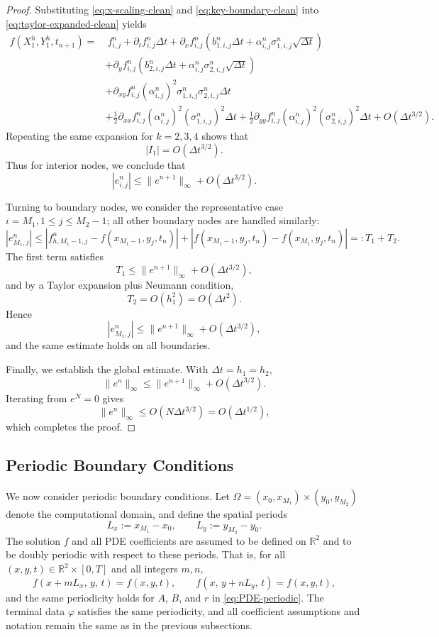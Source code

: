 \documentclass[11pt]{article}
\theoremstyle{mythm}
\theoremstyle{definition}
\begin{document}
\begin{proof}
		Substituting \eqref{eq:x-scaling-clean} and \eqref{eq:key-boundary-clean} into \eqref{eq:taylor-expanded-clean} yields
		\[
		\begin{aligned}
			f(X_1^h,Y_1^h,t_{n+1})
			=&\ f_{i,j}^n 
			+ \partial_t f_{i,j}^n\Delta t
			+ \partial_x f_{i,j}^n(b_{1,i,j}^n\Delta t + \alpha_{i,j}^n\sigma_{1,i,j}^n\sqrt{\Delta t}) \\
			&+ \partial_y f_{i,j}^n(b_{2,i,j}^n\Delta t + \alpha_{i,j}^n\sigma_{2,i,j}^n\sqrt{\Delta t}) \\
			&+ \partial_{xy}f_{i,j}^n(\alpha_{i,j}^n)^2\sigma_{1,i,j}^n\sigma_{2,i,j}^n\Delta t \\
			&+ \frac12 \partial_{xx}f_{i,j}^n(\alpha_{i,j}^n)^2(\sigma_{1,i,j}^n)^2\Delta t
			+ \frac12 \partial_{yy}f_{i,j}^n(\alpha_{i,j}^n)^2(\sigma_{2,i,j}^n)^2\Delta t
			+ O(\Delta t^{3/2}).
		\end{aligned}
		\]
		Repeating the same expansion for $k=2,3,4$ shows that
		\[
		|I_1| = O(\Delta t^{3/2}).
		\]
		Thus for interior nodes, we conclude that
		\[
		|e_{i,j}^n|
		\le \|e^{n+1}\|_\infty + O(\Delta t^{3/2}).
		\]
		
		Turning to boundary nodes, we consider the representative case $i=M_1,1\leq j\leq M_2-1$; all other boundary nodes are handled similarly:
		\[
		|e_{M_1,j}^n|
		\le 
		|f_{h,M_1-1,j}^n - f(x_{M_1-1},y_j,t_n)|
		+
		|f(x_{M_1-1},y_j,t_n)-f(x_{M_1},y_j,t_n)|
		=:T_1+T_2.
		\]
		The first term satisfies
		\[
		T_1 \le \|e^{n+1}\|_\infty + O(\Delta t^{3/2}),
		\]
		and by a Taylor expansion plus Neumann condition,
		\[
		T_2 = O(h_1^2) = O(\Delta t^2).
		\]
		Hence
		\[
		|e_{M_1,j}^n|
		\le \|e^{n+1}\|_\infty + O(\Delta t^{3/2}),
		\]
		and the same estimate holds on all boundaries.
		
		Finally, we establish the global estimate. With $\Delta t=h_1=h_2$,
		\[
		\|e^n\|_\infty \le \|e^{n+1}\|_\infty + O(\Delta t^{3/2}).
		\]
		Iterating from $e^N=0$ gives
		\[
		\|e^n\|_\infty \le O(N\Delta t^{3/2}) = O(\Delta t^{1/2}),
		\]
		which completes the proof.
	\end{proof}
	\subsection{Periodic Boundary Conditions}
	\label{subsec:periodic}
	
	We now consider periodic boundary conditions.
	Let $\Omega = (x_0,x_{M_1}) \times (y_0,y_{M_2})$ denote the computational domain, and define the spatial periods
	\[
	L_x := x_{M_1}-x_0, \qquad L_y := y_{M_2}-y_0.
	\]
	The solution $f$ and all PDE coefficients are assumed to be defined on $\mathbb{R}^2$ and to be doubly periodic with respect to these periods.  
	That is, for all $(x,y,t)\in\mathbb{R}^2\times[0,T]$ and all integers $m,n$,
	\[
	f(x + mL_x,\, y,\, t) = f(x,y,t), 
	\qquad
	f(x,\, y + nL_y,\, t) = f(x,y,t),
	\]
	and the same periodicity holds for $A$, $B$, and $r$ in \eqref{eq:PDE-periodic}.  
	The terminal data $\varphi$ satisfies the same periodicity, and all coefficient assumptions and notation remain the same as in the previous subsections.
	
\end{document}
